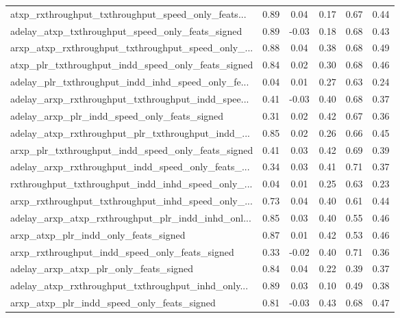 \begin{tabular}{|l|*{4}{c}|r|}
atxp\_rxthroughput\_txthroughput\_speed\_only\_feats... & 0.89 &  0.04 &    0.17 &       0.67 &  0.44 \\
adelay\_atxp\_txthroughput\_speed\_only\_feats\_signed   & 0.89 & -0.03 &    0.18 &       0.68 &  0.43 \\
arxp\_atxp\_rxthroughput\_txthroughput\_speed\_only\_... & 0.88 &  0.04 &    0.38 &       0.68 &  0.49 \\
atxp\_plr\_txthroughput\_indd\_speed\_only\_feats\_signed & 0.84 &  0.02 &    0.30 &       0.68 &  0.46 \\
adelay\_plr\_txthroughput\_indd\_inhd\_speed\_only\_fe... & 0.04 &  0.01 &    0.27 &       0.63 &  0.24 \\
adelay\_arxp\_rxthroughput\_txthroughput\_indd\_spee... & 0.41 & -0.03 &    0.40 &       0.68 &  0.37 \\
adelay\_arxp\_plr\_indd\_speed\_only\_feats\_signed       & 0.31 &  0.02 &    0.42 &       0.67 &  0.36 \\
adelay\_atxp\_rxthroughput\_plr\_txthroughput\_indd\_... & 0.85 &  0.02 &    0.26 &       0.66 &  0.45 \\
arxp\_plr\_txthroughput\_indd\_speed\_only\_feats\_signed & 0.41 &  0.03 &    0.42 &       0.69 &  0.39 \\
adelay\_arxp\_rxthroughput\_indd\_speed\_only\_feats\_... & 0.34 &  0.03 &    0.41 &       0.71 &  0.37 \\
rxthroughput\_txthroughput\_indd\_inhd\_speed\_only\_... & 0.04 &  0.01 &    0.25 &       0.63 &  0.23 \\
arxp\_rxthroughput\_txthroughput\_inhd\_speed\_only\_... & 0.73 &  0.04 &    0.40 &       0.61 &  0.44 \\
adelay\_arxp\_atxp\_rxthroughput\_plr\_indd\_inhd\_onl... & 0.85 &  0.03 &    0.40 &       0.55 &  0.46 \\
arxp\_atxp\_plr\_indd\_only\_feats\_signed               & 0.87 &  0.01 &    0.42 &       0.53 &  0.46 \\
arxp\_rxthroughput\_indd\_speed\_only\_feats\_signed     & 0.33 & -0.02 &    0.40 &       0.71 &  0.36 \\
adelay\_arxp\_atxp\_plr\_only\_feats\_signed             & 0.84 &  0.04 &    0.22 &       0.39 &  0.37 \\
adelay\_atxp\_rxthroughput\_txthroughput\_inhd\_only... & 0.89 &  0.03 &    0.10 &       0.49 &  0.38 \\
arxp\_atxp\_plr\_indd\_speed\_only\_feats\_signed         & 0.81 & -0.03 &    0.43 &       0.68 &  0.47 \\

\end{tabular}
